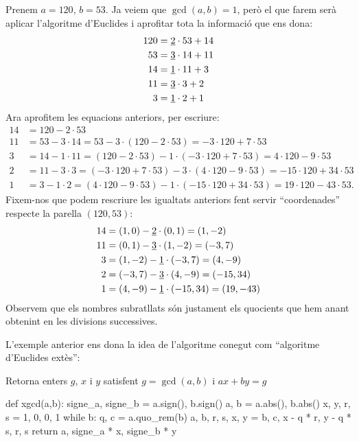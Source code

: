  \begin{example}
 Prenem $a=120$, $b = 53$. Ja veiem que $\gcd(a,b)=1$, però el que farem serà aplicar l'algoritme d'Euclides i aprofitar tota la informació que ens dona:
 \begin{align*}
120 &= \underline 2\cdot 53 + 14\\
53 & = \underline 3\cdot 14 + 11\\
14 &= \underline 1 \cdot 11 + 3\\
11 &= \underline 3\cdot 3 + 2\\
3 &= \underline 1\cdot 2 + 1\\
 \end{align*}
 Ara aprofitem les equacions anteriors, per escriure:
 \begin{align*}
 14 &= 120 - 2\cdot 53\\
 11 &= 53 - 3\cdot 14 = 53 - 3\cdot(120 - 2\cdot 53) = -3\cdot 120 + 7\cdot 53\\
 3 &= 14 - 1\cdot 11 = (120 - 2\cdot 53) -1\cdot(-3\cdot 120 +7\cdot 53) = 4\cdot 120 -9\cdot 53\\
 2 &= 11 - 3\cdot 3 = (-3\cdot 120 + 7\cdot 53) - 3\cdot (4\cdot 120 - 9\cdot 53) = -15\cdot 120 + 34\cdot 53\\
 1 &= 3 - 1\cdot 2 = (4\cdot 120 - 9\cdot 53) - 1\cdot(-15\cdot 120 + 34\cdot 53) = 19\cdot 120 - 43\cdot 53.
 \end{align*}
 Fixem-nos que podem rescriure les igualtats anteriors fent servir ``coordenades'' respecte la parella $(120, 53)$:
 \begin{align*}
     14 &= (1,0) - \underline{2}\cdot (0,1) = (1,-2)\\
     11 &= (0,1) - \underline{3}\cdot (1,-2) = (-3,7)\\
     3 &=  (1,-2) - \underline{1}\cdot(-3,7) = (4,-9)\\
     2 &= (-3,7) - \underline{3}\cdot(4,-9) = (-15,34)\\
     1 &= (4,-9) - \underline{1}\cdot(-15,34) = (19,-43)
 \end{align*}
 Observem que els nombres subratllats són justament els quocients que hem anant obtenint en les divisions successives.
 \end{example}
 L'exemple anterior ens dona la idea de l'algoritme conegut com ``algoritme d'Euclides extès'':
 \begin{algo}
 \caption{Retorna enters $g$, $x$ i $y$ satisfent $g=\gcd(a,b)$ i $ax+by=g$}
 \begin{python}
 def xgcd(a,b):
    signe_a, signe_b = a.sign(), b.sign()
    a, b = a.abs(), b.abs()
    x, y, r, s = 1, 0, 0, 1
    while b:
        q, c = a.quo_rem(b)
        a, b, r, s, x, y = b, c, x - q * r, y - q * s, r, s
    return a, signe_a * x, signe_b * y
 \end{python}
 \end{algo}
 
